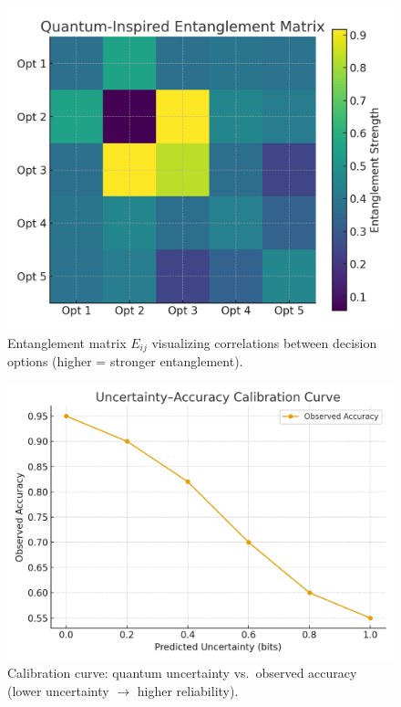 \documentclass[conference]{IEEEtran}
\begin{document}
\begin{figure}[t]
\centering
\includegraphics[width=\columnwidth]{entanglement_heatmap.png}
\caption{Entanglement matrix $E_{ij}$ visualizing correlations between decision options (higher = stronger entanglement).}
\label{fig:entanglement_heatmap}
\end{figure}

\begin{figure}[t]
\centering
\includegraphics[width=\columnwidth]{calibration_curve.png}
\caption{Calibration curve: quantum uncertainty vs.\ observed accuracy (lower uncertainty $\rightarrow$ higher reliability).}
\label{fig:calibration_curve}
\end{figure}
\end{document}
